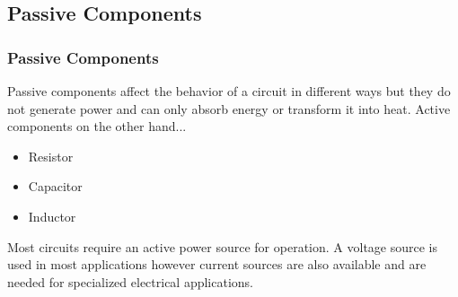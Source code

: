 \documentclass[fleqn]{beamer} %
\newcommand{\sectionIsubsectionItitle}{Passive Components}
\begin{document}
		\subsection{\sectionIsubsectionItitle}\label{sectionIsubsectionI}

			\begin{frame}
				\frametitle{\sectionIsubsectionItitle}
				
				Passive components affect the behavior of a circuit in different ways but they do   not generate power and can only absorb energy or transform it into heat. Active components on the other hand...

				\begin{itemize}
				\item Resistor 
				\item Capacitor
				\item Inductor
				\end{itemize}

				Most circuits require an active power source for operation. A voltage source is used in most applications however current sources are also available and are needed for specialized electrical applications. 

			\end{frame}
\end{document}
